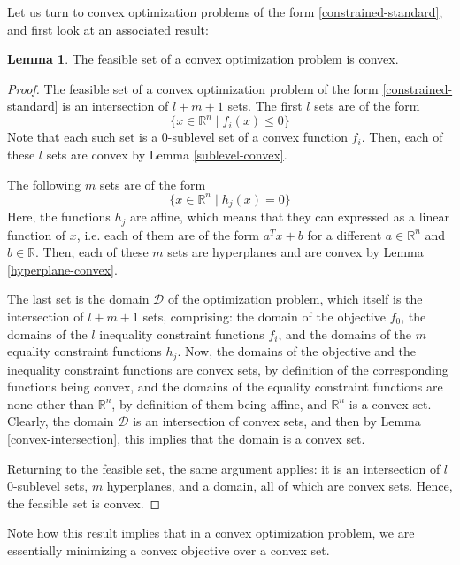 \documentclass[a4paper]{article}
\theoremstyle{definition}
\newtheorem{lemma}{Lemma}[subsection]
\begin{document}
Let us turn to convex optimization problems of the form \eqref{constrained-standard}, and first look at an associated result:
\begin{lemma}
	\label{feasible-convex}
	The feasible set of a convex optimization problem is convex.
\end{lemma}
\begin{proof}
	The feasible set of a convex optimization problem of the form \eqref{constrained-standard} is an intersection of $l + m + 1$ sets.
	The first $l$ sets are of the form
	\begin{equation*}
		\{ x \in \mathbb{R}^n \mid f_i(x) \leq 0 \}
	\end{equation*}
	Note that each such set is a 0-sublevel set of a convex function $f_i$.
	Then, each of these $l$ sets are convex by Lemma \ref{sublevel-convex}.

	The following $m$ sets are of the form
	\begin{equation*}
		\{ x \in \mathbb{R}^n \mid h_j(x) = 0 \}
	\end{equation*}
	Here, the functions $h_j$ are affine, which means that they can expressed as a linear function of $x$, i.e. each of them are of the form $a^T x + b$ for a different $a \in \mathbb{R}^n$ and $b \in \mathbb{R}$.
	Then, each of these $m$ sets are hyperplanes and are convex by Lemma \ref{hyperplane-convex}.

	The last set is the domain $\mathcal{D}$ of the optimization problem, which itself is the intersection of $l + m + 1$ sets, comprising: the domain of the objective $f_0$, the domains of the $l$ inequality constraint functions $f_i$, and the domains of the $m$ equality constraint functions $h_j$.
	Now, the domains of the objective and the inequality constraint functions are convex sets, by definition of the corresponding functions being convex, and the domains of the equality constraint functions are none other than $\mathbb{R}^n$, by definition of them being affine, and $\mathbb{R}^n$ is a convex set.
	Clearly, the domain $\mathcal{D}$ is an intersection of convex sets, and then by Lemma \ref{convex-intersection}, this implies that the domain is a convex set.

	Returning to the feasible set, the same argument applies: it is an intersection of $l$ 0-sublevel sets, $m$ hyperplanes, and a domain, all of which are convex sets.
	Hence, the feasible set is convex.
\end{proof}

Note how this result implies that in a convex optimization problem, we are essentially minimizing a convex objective over a convex set.
\end{document}
